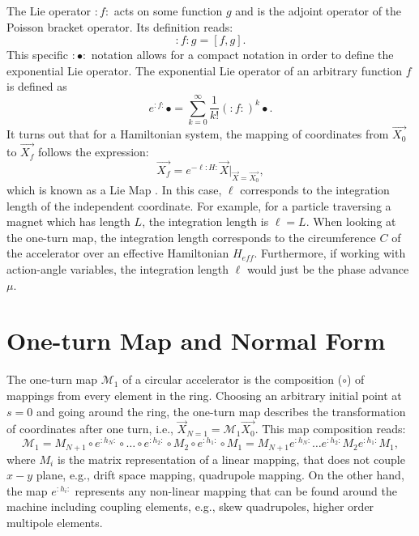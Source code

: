 The Lie operator $:f:$ acts on some function $g$ and is the adjoint operator of the Poisson bracket operator. Its definition reads:
\begin{equation}
    \label{eq:ch1lie1}
    :f:g = \left[ f,g \right].
\end{equation}
This specific $:\bullet:$ notation allows for a compact notation in order to define the exponential Lie operator. The exponential Lie operator of an arbitrary function $f$ is defined as
\begin{equation}
    \label{eq:ch1explie1}
    e^{:f:}\bullet = \sum_{k=0}^{\infty}\frac{1}{k!}\left( :f: \right)^k \bullet.
\end{equation}
It turns out that for a Hamiltonian system, the mapping of coordinates from $\vec{X_0}$ to $\vec{X_f}$ follows the expression:
\begin{equation}
    \label{eq:liemap1}
    \vec{X_f}=e^{-\ell :H:}\vec{X}\bigg\rvert_{\vec{X}=\vec{X_0}},
\end{equation}
which is known as a Lie Map \cite{todd1}. In this case, $\ell$ corresponds to the integration length of the independent coordinate. For example, for a particle traversing a magnet which has length $L$, the integration length is $\ell = L$. When looking at the one-turn map, the integration length corresponds to the circumference $C$ of the accelerator over an effective Hamiltonian $H_{eff}$. Furthermore, if working with action-angle variables, the integration length $\ell$ would just be the phase advance $\mu$.\\ 

\section{One-turn Map and Normal Form}

The one-turn map $\mathcal{M}_1$ of a circular accelerator is the composition ($\circ$) of mappings from every element in the ring. Choosing an arbitrary initial point at $s=0$ and going around the ring, the one-turn map describes the transformation of coordinates after one turn, i.e., $\vec{X}_{N=1}=\mathcal{M}_1 \vec{X_0}$. This map composition reads:
\begin{equation}
    \label{eq:oneturnmap}
    \mathcal{M}_1=M_{N+1} \circ e^{:h_N:} \circ \dots \circ e^{:h_2:} \circ M_2 \circ e^{:h_1:} \circ M_1 = M_{N+1}e^{:h_N:} \dots e^{:h_2:}M_2 e^{:h_1:}M_1,
\end{equation}
where $M_i$ is the matrix representation of a linear mapping, that does not couple $x-y$ plane, e.g., drift space mapping, quadrupole mapping. On the other hand, the map $e^{:h_i:}$ represents any non-linear mapping that can be found around the machine including coupling elements, e.g., skew quadrupoles, higher order multipole elements.  

